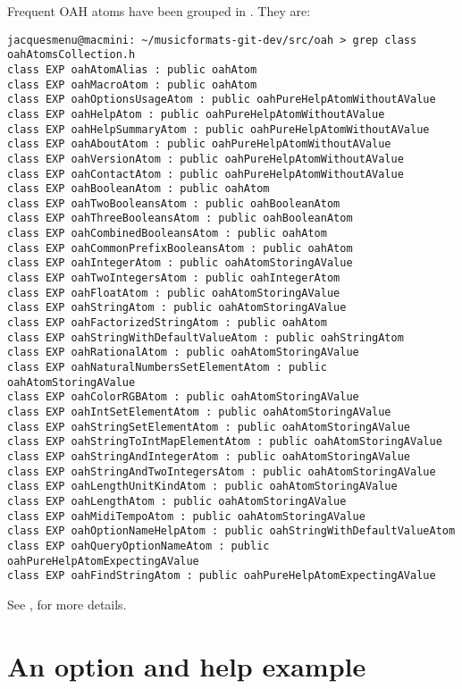 {Frequent OAH atoms have been grouped in . They are:
\begin{lstlisting}[language=Terminal]
jacquesmenu@macmini: ~/musicformats-git-dev/src/oah > grep class   oahAtomsCollection.h
class EXP oahAtomAlias : public oahAtom
class EXP oahMacroAtom : public oahAtom
class EXP oahOptionsUsageAtom : public oahPureHelpAtomWithoutAValue
class EXP oahHelpAtom : public oahPureHelpAtomWithoutAValue
class EXP oahHelpSummaryAtom : public oahPureHelpAtomWithoutAValue
class EXP oahAboutAtom : public oahPureHelpAtomWithoutAValue
class EXP oahVersionAtom : public oahPureHelpAtomWithoutAValue
class EXP oahContactAtom : public oahPureHelpAtomWithoutAValue
class EXP oahBooleanAtom : public oahAtom
class EXP oahTwoBooleansAtom : public oahBooleanAtom
class EXP oahThreeBooleansAtom : public oahBooleanAtom
class EXP oahCombinedBooleansAtom : public oahAtom
class EXP oahCommonPrefixBooleansAtom : public oahAtom
class EXP oahIntegerAtom : public oahAtomStoringAValue
class EXP oahTwoIntegersAtom : public oahIntegerAtom
class EXP oahFloatAtom : public oahAtomStoringAValue
class EXP oahStringAtom : public oahAtomStoringAValue
class EXP oahFactorizedStringAtom : public oahAtom
class EXP oahStringWithDefaultValueAtom : public oahStringAtom
class EXP oahRationalAtom : public oahAtomStoringAValue
class EXP oahNaturalNumbersSetElementAtom : public oahAtomStoringAValue
class EXP oahColorRGBAtom : public oahAtomStoringAValue
class EXP oahIntSetElementAtom : public oahAtomStoringAValue
class EXP oahStringSetElementAtom : public oahAtomStoringAValue
class EXP oahStringToIntMapElementAtom : public oahAtomStoringAValue
class EXP oahStringAndIntegerAtom : public oahAtomStoringAValue
class EXP oahStringAndTwoIntegersAtom : public oahAtomStoringAValue
class EXP oahLengthUnitKindAtom : public oahAtomStoringAValue
class EXP oahLengthAtom : public oahAtomStoringAValue
class EXP oahMidiTempoAtom : public oahAtomStoringAValue
class EXP oahOptionNameHelpAtom : public oahStringWithDefaultValueAtom
class EXP oahQueryOptionNameAtom : public oahPureHelpAtomExpectingAValue
class EXP oahFindStringAtom : public oahPureHelpAtomExpectingAValue
\end{lstlisting}

See , for more details.


\section{An option and help example}

}
